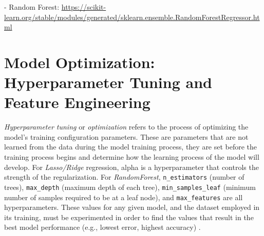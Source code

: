 \documentclass[12pt]{report} %
\begin{document}





- Random Forest: \url{https://scikit-learn.org/stable/modules/generated/sklearn.ensemble.RandomForestRegressor.html}



\section{Model Optimization: Hyperparameter Tuning and Feature Engineering}

\textit{Hyperparameter tuning} or \textit{optimization} refers to the process of optimizing the model's training configuration parameters. These are parameters that are not learned from the data during the model training process, they are set before the training process begins and determine how the learning process of the model will develop. For \textit{Lasso/Ridge} regression, alpha is a hyperparameter that controls the strength of the regularization. For \textit{RandomForest}, \verb|n_estimators| (number of trees), \verb|max_depth| (maximum depth of each tree), \verb|min_samples_leaf| (minimum number of samples required to be at a leaf node), and \verb|max_features| are all hyperparameters. These values for any given model, and the dataset employed in its training, must be experimented in order to find the values that result in the best model performance (e.g., lowest error, highest accuracy) \cite{AWSHyperparameterTuning}.
\end{document}
